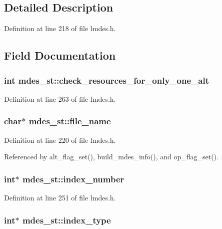 

\subsection{Detailed Description}




Definition at line 218 of file lmdes.h.

\subsection{Field Documentation}
\subsubsection{\setlength{\rightskip}{0pt plus 5cm}int \bf{mdes\_\-st::check\_\-resources\_\-for\_\-only\_\-one\_\-alt}}\label{structmdes__st_abdf4dd8937ff6286441bd8b50726e63}




Definition at line 263 of file lmdes.h.
\subsubsection{\setlength{\rightskip}{0pt plus 5cm}char$\ast$ \bf{mdes\_\-st::file\_\-name}}\label{structmdes__st_ee752ea650881fc151fdc2f5cf212168}




Definition at line 220 of file lmdes.h.

Referenced by alt\_\-flag\_\-set(), build\_\-mdes\_\-info(), and op\_\-flag\_\-set().
\subsubsection{\setlength{\rightskip}{0pt plus 5cm}int$\ast$ \bf{mdes\_\-st::index\_\-number}}\label{structmdes__st_9fdc97a8bdb375a2d30c70364d25843e}




Definition at line 251 of file lmdes.h.
\subsubsection{\setlength{\rightskip}{0pt plus 5cm}int$\ast$ \bf{mdes\_\-st::index\_\-type}}\label{structmdes__st_e86ef055a4b821949430f28aeb444c19}




